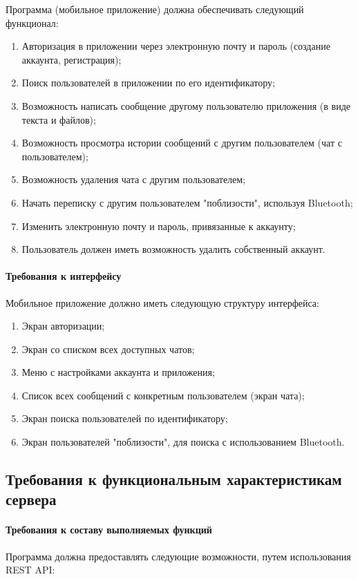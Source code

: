 \documentclass[explnote]{espd}
\begin{document}
Программа (мобильное приложение) должна обеспечивать следующий функционал:

\begin{enumerate}
\item Авторизация в приложении через электронную почту и пароль (создание аккаунта, регистрация);
\item Поиск пользователей в приложении по его идентификатору;
\item Возможность написать сообщение другому пользователю приложения (в виде текста и файлов);
\item Возможность просмотра истории сообщений с другим пользователем (чат с пользователем);
\item Возможность удаления чата с другим пользователем;
\item Начать переписку с другим пользователем "поблизости", используя Bluetooth;
\item Изменить электронную почту и пароль, привязанные к аккаунту;
\item Пользователь должен иметь возможность удалить собственный аккаунт.
\end{enumerate}

\paragraph{Требования к интерфейсу}

Мобильное приложение должно иметь следующую структуру интерфейса:

\begin{enumerate}
\item Экран авторизации;
\item Экран со списком всех доступных чатов;
\item Меню с настройками аккаунта и приложения;
\item Список всех сообщений с конкретным пользователем (экран чата);
\item Экран поиска пользователей по идентификатору;
\item Экран пользователей "поблизости", для поиска с использованием Bluetooth.
\end{enumerate}

\subsection{Требования к функциональным характеристикам сервера}
\paragraph{Требования к составу выполняемых функций}
Программа должна предоставлять следующие возможности, путем использования REST API:
\end{document}
